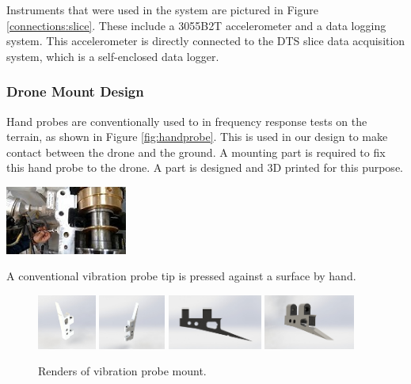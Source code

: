 Instruments that were used in the system are pictured in Figure \ref{connections:slice}. These include a 3055B2T accelerometer and a data logging system. This accelerometer is directly connected to the DTS slice data acquisition system, which is a self-enclosed data logger.



\subsubsection{Drone Mount Design}


Hand probes are conventionally used to in frequency response tests on the terrain, as shown in Figure \ref{fig:handprobe}. This is used in our design to make contact between the drone and the ground. A mounting part is required to fix this hand probe to the drone. A part is designed and 3D printed for this purpose.

\begin{marginfigure}%
    \raggedright
    \includegraphics[width=4cm]{images/stage_graphs/vibration_results/vibration_probe_use.jpg}
    \caption{A conventional vibration probe tip is pressed against a surface by hand.}
    \label{fig:handprobe}
\end{marginfigure}  

\begin{figure}[!h]
    \raggedright
    \includegraphics[height=1.8cm]{images/stage_system/renders/accelerometer_mount/abs_side1.JPG}
    \includegraphics[height=1.8cm]{images/stage_system/renders/accelerometer_mount/abs_side2.JPG}
    \includegraphics[height=1.8cm]{images/stage_system/renders/accelerometer_mount/profile.JPG}
    \includegraphics[height=1.8cm]{images/stage_system/renders/accelerometer_mount/steel_corner.JPG}
    \caption{Renders of vibration probe mount.}
\end{figure}

